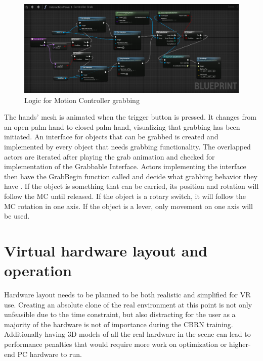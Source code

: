 \documentclass[12pt, a4paper,oneside, nocenter]{thesis}
\begin{document}
\begin{figure}[H]
	\includegraphics[width=\textwidth]{grab-blueprint}
	\caption{Logic for Motion Controller grabbing}
	\label{fig:grab-blueprint}
\end{figure}
The hands' mesh is animated when the trigger button is pressed. It changes from an open palm hand to closed palm hand, visualizing that grabbing has been initiated. An interface for objects that can be grabbed is created and implemented by every object that needs grabbing functionality. The overlapped actors are iterated after playing the grab animation and checked for implementation of the Grabbable Interface. Actors implementing the interface then have the GrabBegin function called and decide what grabbing behavior they have . If the object is something that can be carried, its position and rotation will follow the MC until released. If the object is a rotary switch, it will follow the MC rotation in one axis. If the object is a lever, only movement on one axis will be used.
\section{Virtual hardware layout and operation}
Hardware layout needs to be planned to be both realistic and simplified for VR use. Creating an absolute clone of the real environment at this point is not only unfeasible due to the time constraint, but also distracting for the user as a majority of the hardware is not of importance during the CBRN training. Additionally having 3D models of all the real hardware in the scene can lead to performance penalties that would require more work on optimization or higher-end PC hardware to run.
\end{document}
